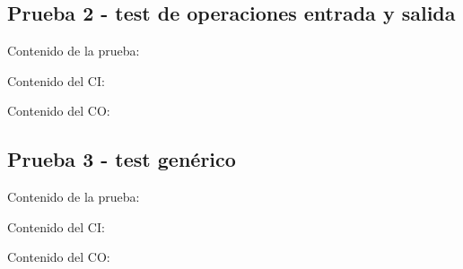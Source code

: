 \documentclass[11pt, , a4paper, titlepage]{article}
\newenvironment{changemargin}[2]{%
\begin{list}{}{%
\setlength{\topsep}{0pt}%
\setlength{\leftmargin}{#1}%
\setlength{\rightmargin}{#2}%
\setlength{\listparindent}{\parindent}%
\setlength{\itemindent}{\parindent}%
\setlength{\parsep}{\parskip}%
}%
\item[]}{\end{list}}
\begin{document}
\subsection{Prueba 2 - test de operaciones entrada y salida}
\vspace{2mm}
Contenido de la prueba:
\vspace{2mm}
\begin{changemargin}{+3cm}{+2cm}
    
\end{changemargin} 
\vspace{2mm}
Contenido del CI:
\vspace{2mm}
\begin{changemargin}{+1cm}{+0cm}
    
\end{changemargin} 
\vspace{2mm}
Contenido del CO:
\vspace{2mm}
\begin{changemargin}{+1cm}{-2cm}
    
\end{changemargin} 

\clearpage

\subsection{Prueba 3 - test genérico}
\vspace{2mm}
Contenido de la prueba:
\vspace{2mm}
\begin{changemargin}{+3cm}{+2cm}
    
\end{changemargin} 
\vspace{2mm}
Contenido del CI:
\vspace{2mm}
\begin{changemargin}{+1cm}{+0cm}
    
\end{changemargin} 
\vspace{2mm}
Contenido del CO:
\vspace{2mm}
\begin{changemargin}{+1cm}{-2cm}
    
\end{changemargin} 
\end{document}
